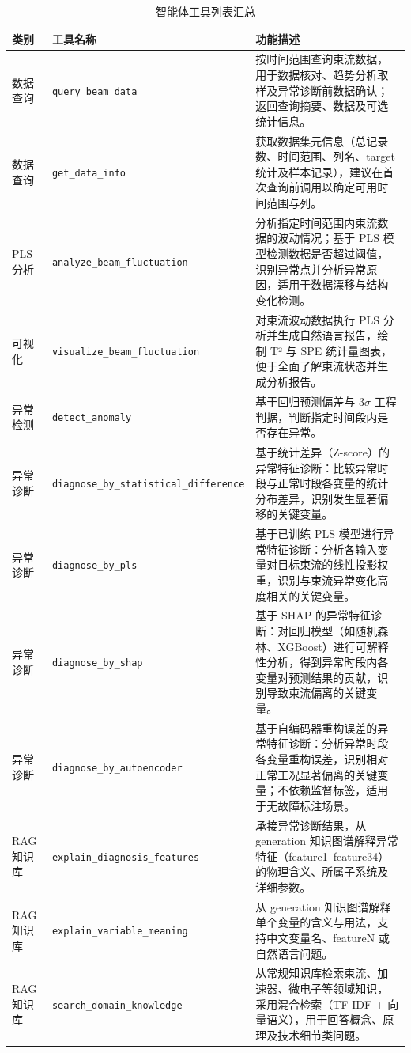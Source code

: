 
\begin{table}[htbp]
  \centering
  \caption{智能体工具列表汇总}
  \label{tab:tools-summary}
  \small
  \begin{tabular}{llp{8.2cm}}
    \toprule
    \textbf{类别} & \textbf{工具名称} & \textbf{功能描述} \\
    \midrule
    数据查询 & \texttt{query\_beam\_data} & 按时间范围查询束流数据，用于数据核对、趋势分析取样及异常诊断前数据确认；返回查询摘要、数据及可选统计信息。 \\
    数据查询 & \texttt{get\_data\_info} & 获取数据集元信息（总记录数、时间范围、列名、target 统计及样本记录），建议在首次查询前调用以确定可用时间范围与列。 \\
    \midrule
    PLS 分析 & \texttt{analyze\_beam\_fluctuation} & 分析指定时间范围内束流数据的波动情况；基于 PLS 模型检测数据是否超过阈值，识别异常点并分析异常原因，适用于数据漂移与结构变化检测。 \\
    \midrule
    可视化 & \texttt{visualize\_beam\_fluctuation} & 对束流波动数据执行 PLS 分析并生成自然语言报告，绘制 T² 与 SPE 统计量图表，便于全面了解束流状态并生成分析报告。 \\
    \midrule
    异常检测 & \texttt{detect\_anomaly} & 基于回归预测偏差与 3$\sigma$ 工程判据，判断指定时间段内是否存在异常。 \\
    \midrule
    异常诊断 & \texttt{diagnose\_by\_statistical\_difference} & 基于统计差异（Z-score）的异常特征诊断：比较异常时段与正常时段各变量的统计分布差异，识别发生显著偏移的关键变量。 \\
    异常诊断 & \texttt{diagnose\_by\_pls} & 基于已训练 PLS 模型进行异常特征诊断：分析各输入变量对目标束流的线性投影权重，识别与束流异常变化高度相关的关键变量。 \\
    异常诊断 & \texttt{diagnose\_by\_shap} & 基于 SHAP 的异常特征诊断：对回归模型（如随机森林、XGBoost）进行可解释性分析，得到异常时段内各变量对预测结果的贡献，识别导致束流偏离的关键变量。 \\
    异常诊断 & \texttt{diagnose\_by\_autoencoder} & 基于自编码器重构误差的异常特征诊断：分析异常时段各变量重构误差，识别相对正常工况显著偏离的关键变量；不依赖监督标签，适用于无故障标注场景。 \\
    \midrule
    RAG 知识库 & \texttt{explain\_diagnosis\_features} & 承接异常诊断结果，从 generation 知识图谱解释异常特征（feature1--feature34）的物理含义、所属子系统及详细参数。 \\
    RAG 知识库 & \texttt{explain\_variable\_meaning} & 从 generation 知识图谱解释单个变量的含义与用法，支持中文变量名、featureN 或自然语言问题。 \\
    RAG 知识库 & \texttt{search\_domain\_knowledge} & 从常规知识库检索束流、加速器、微电子等领域知识，采用混合检索（TF-IDF + 向量语义），用于回答概念、原理及技术细节类问题。 \\
    \bottomrule
  \end{tabular}
\end{table}
